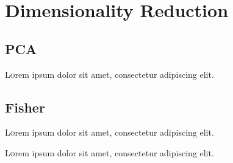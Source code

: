 \section{Dimensionality Reduction}

\subsection{PCA}
\lettrine[nindent=0em,lines=3]{L} orem ipsum dolor sit amet, consectetur adipiscing elit.
\lipsum[2-3] %


\subsection{Fisher}
\lettrine[nindent=0em,lines=3]{L} orem ipsum dolor sit amet, consectetur adipiscing elit.
\lipsum[2-3] %

\lettrine[nindent=0em,lines=3]{L} orem ipsum dolor sit amet, consectetur adipiscing elit.
\lipsum[2-3] %

